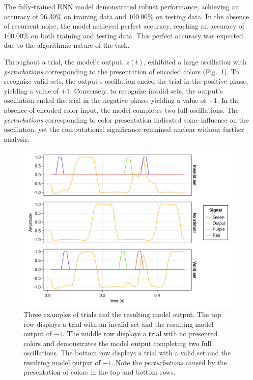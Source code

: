 \documentclass[conference]{IEEEtran}
\begin{document}
The fully-trained RNN model demonstrated robust performance, achieving an accuracy of $96.30\%$ on training data and $100.00\%$ on testing data. In the absence of recurrent noise, the model achieved perfect accuracy, reaching an accuracy of $100.00\%$ on both training and testing data. This perfect accuracy was expected due to the algorithmic nature of the task\cite{power2022grokking,nanda2023progress}. 

Throughout a trial, the model's output, $z(t)$, exhibited a large oscillation with \textit{perturbations} corresponding to the presentation of encoded colors (Fig.~\ref{exampletrialstimuli}). To recognize valid sets, the output's oscillation ended the trial in the positive phase, yielding a value of $+1$. Conversely, to recognize invalid sets, the output's oscillation ended the trial in the negative phase, yielding a value of $-1$. In the absence of encoded color input, the model completes two full oscillations. The \textit{perturbations} corresponding to color presentation indicated some influence on the oscillation, yet the computational significance remained unclear without further analysis.

\begin{figure}[htbp]
\centerline{\includegraphics[scale=0.10]{SET_examples.png}}
\caption{Three examples of trials and the resulting model output. The top row displays a trial with an invalid set and the resulting model output of $-1$. The middle row displays a trial with no presented colors and demonstrates the model output completing two full oscillations. The bottom row displays a trial with a valid set and the resulting model output of $-1$. Note the \textit{perturbations} caused by the presentation of colors in the top and bottom rows.}
\label{exampletrialstimuli}
\end{figure}
\end{document}

